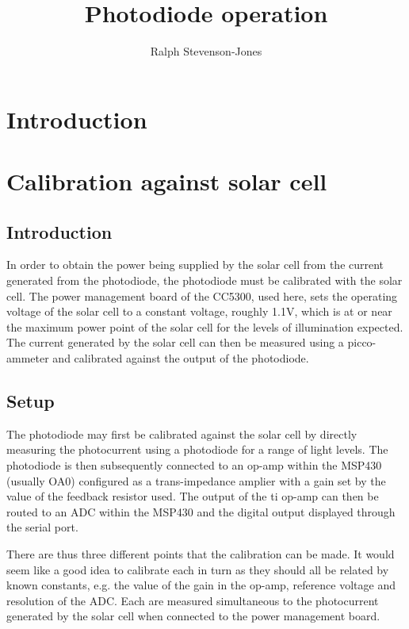 \documentclass[11pt]{article} %
\title{Photodiode operation}
\author{Ralph Stevenson-Jones}
\begin{document}
\maketitle

\section{Introduction}

\section{Calibration against solar cell}

\subsection{Introduction}

In order to obtain the power being supplied by the solar cell from the current generated from the photodiode, the photodiode must be calibrated with the solar cell.  The power management board of the CC5300, used here, sets the operating voltage of the solar cell to a constant voltage, roughly 1.1V, which is at or near the maximum power point of the solar cell for the levels of illumination expected.  The current generated by the solar cell can then be measured using a picco-ammeter and calibrated against the output of the photodiode.

\subsection{Setup}
The photodiode may first be calibrated against the solar cell by directly measuring the photocurrent using a photodiode for a range of light levels.
The photodiode is then subsequently connected to an op-amp within the MSP430 (usually OA0) configured as a trans-impedance amplier with a gain set by the value of the feedback resistor used.
The output of the ti op-amp can then be routed to an ADC within the MSP430 and the digital output displayed through the serial port.

There are thus three different points that the calibration can be made.  It would seem like a good idea to calibrate each in turn as they should all be related by known constants, e.g. the value of the gain in the op-amp, reference voltage and resolution of the ADC.  Each are measured simultaneous to the photocurrent generated by the solar cell when connected to the power management board.
\end{document}

